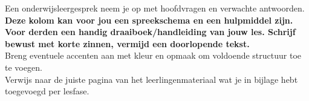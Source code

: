 {{\begin{lesdeel}
            Een onderwijsleergesprek neem je op met hoofdvragen en verwachte  antwoorden.  \\
            
            \textbf{Deze kolom kan voor jou een  spreekschema en een hulpmiddel zijn. Voor derden een handig draaiboek/handleiding van jouw les.
            Schrijf bewust met korte zinnen, vermijd een doorlopende tekst.} \\
            
            Breng eventuele accenten aan met kleur en opmaak om voldoende structuur toe te  voegen. \\
            
            Verwijs naar de juiste pagina van het leerlingenmateriaal wat je in bijlage hebt toegevoegd per lesfase.
        \end{lesdeel}%
    }
}

\newcommand{\helpbijlagen}{
    \extratext{
        Voeg hieronder de relevante bijlage(n) toe. 
        Voorbeelden van relevante bijlagen zijn bordschema, PowerPoint, lesmaterialen, leerlingen materialen… 
        Vermeld per bijlage een titel (voorbeeld: 6.1. Bordschema).
    }
}

